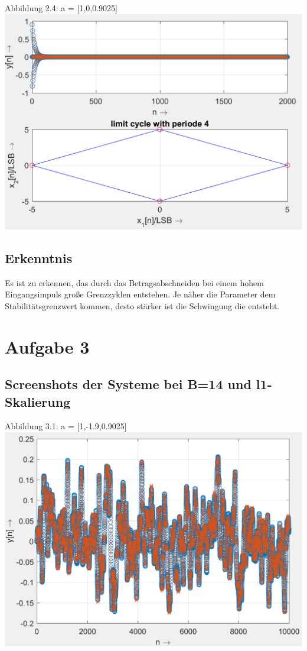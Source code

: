 \begin{center}
Abbildung 2.4: a = [1,0,0.9025]\\
\includegraphics[scale=0.9]{../Tab3_4.PNG}
\end{center}

\subsection{Erkenntnis}

Es ist zu erkennen, das durch das Betragsabschneiden bei einem hohem Eingangsimpuls große Grenzzyklen entstehen. Je näher die Parameter dem Stabilitätsgrenzwert kommen, desto stärker ist die Schwingung die entsteht.

\newpage

\section{Aufgabe 3}

\subsection{Screenshots der Systeme bei B=14 und l1-Skalierung}

\begin{center}
Abbildung 3.1: a = [1,-1.9,0.9025]\\
\includegraphics[scale=0.9]{../Tab4_1_14B_l1.PNG}
\end{center}

